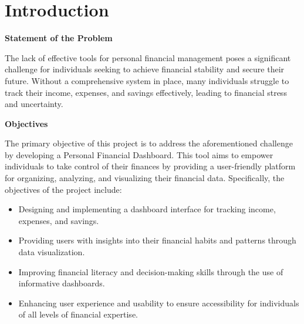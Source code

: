 \chapter*{Introduction}



\textbf{Statement of the Problem}

The lack of effective tools for personal financial management poses a significant challenge for individuals seeking to achieve financial stability and secure their future. Without a comprehensive system in place, many individuals struggle to track their income, expenses, and savings effectively, leading to financial stress and uncertainty.

\textbf{Objectives}

The primary objective of this project is to address the aforementioned challenge by developing a Personal Financial Dashboard. This tool aims to empower individuals to take control of their finances by providing a user-friendly platform for organizing, analyzing, and visualizing their financial data. Specifically, the objectives of the project include:

\begin{itemize}
    \item Designing and implementing a dashboard interface for tracking income, expenses, and savings.
    \item Providing users with insights into their financial habits and patterns through data visualization.
    \item Improving financial literacy and decision-making skills through the use of informative dashboards.
    \item Enhancing user experience and usability to ensure accessibility for individuals of all levels of financial expertise.
\end{itemize}

